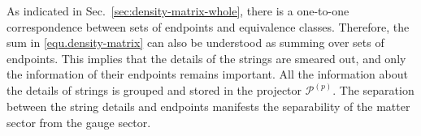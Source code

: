 As indicated in Sec.~\ref{sec:density-matrix-whole}, there is a one-to-one correspondence between sets of endpoints and equivalence classes. Therefore, the sum in \eqref{equ.density-matrix} can also be understood as summing over sets of endpoints. This implies that the details of the strings are smeared out, and only the information of their endpoints remains important. All the information about the details of strings is grouped and stored in the projector $\mathcal{P}^{(p)}$. The separation between the string details and endpoints manifests the separability of the matter sector from the gauge sector.


